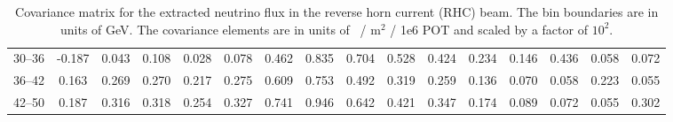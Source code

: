 \begin{table}[tb]
{\begin{tabular}{c|ccccccccccccccc}
    30--36 & -0.187 &  0.043 &  0.108 &  0.028 &  0.078 &  0.462 &  0.835 &  0.704 &  0.528 &  0.424 &  0.234 &  0.146 &  0.436 &  0.058 &  0.072 \\
    36--42 &  0.163 &  0.269 &  0.270 &  0.217 &  0.275 &  0.609 &  0.753 &  0.492 &  0.319 &  0.259 &  0.136 &  0.070 &  0.058 &  0.223 &  0.055 \\
    42--50 &  0.187 &  0.316 &  0.318 &  0.254 &  0.327 &  0.741 &  0.946 &  0.642 &  0.421 &  0.347 &  0.174 &  0.089 &  0.072 &  0.055 &  0.302 \\
\hline
\end{tabular} }
\caption{Covariance matrix for the extracted neutrino flux in the reverse horn current (RHC) beam. The bin boundaries are in units of GeV. The covariance elements are in units of \numu~/ m$^2$ / 1e6 POT and scaled by a factor of $10^2$.}
\label{cov:RHC-nu-flux}
\end{table}

